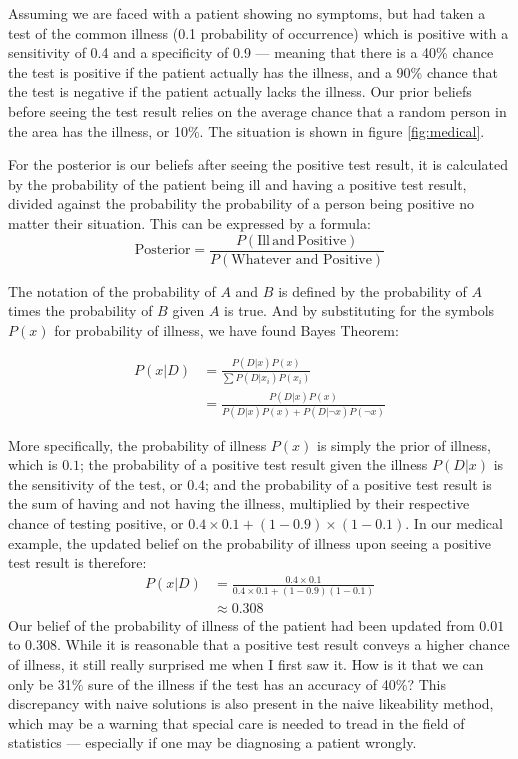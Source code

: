 \documentclass[a4paper,11pt]{article}
\begin{document}
Assuming we are faced with a patient showing no symptoms, but had taken a test of the common illness (0.1 probability of occurrence) which is positive with a sensitivity of 0.4 and a specificity of 0.9 --- meaning that there is a 40\% chance the test is positive if the patient actually has the illness, and a 90\% chance that the test is negative if the patient actually lacks the illness. Our prior beliefs before seeing the test result relies on the average chance that a random person in the area has the illness, or 10\%. The situation is shown in figure \ref{fig:medical}.

For the posterior is our beliefs after seeing the positive test result, it is calculated by the probability of the patient being ill and having a positive test result, divided against the probability the probability of a person being positive no matter their situation. This can be expressed by a formula:
\[
    \text{Posterior} = \frac{P(\text{Ill} \,\text{and}\, \text{Positive})}{P(\text{Whatever and Positive})}
\]

The notation of the probability of $A$ and $B$ is defined by the probability of $A$ times the probability of $B$ given $A$ is true. And by substituting for the symbols $P(x)$ for probability of illness, we have found Bayes Theorem:

\begin{align*}
    P(x|D) &= \frac{P(D|x) P(x)}{\sum P(D|x_i) P(x_i) }\\
     &= \frac{P(D|x)P(x)}{P(D|x)P(x) + P(D|\neg x)P(\neg x)}
\end{align*}

More specifically, the probability of illness $P(x)$ is simply the prior of illness, which is $0.1$; the probability of a positive test result given the illness $P(D|x)$ is the sensitivity of the test, or $0.4$; and the probability of a positive test result is the sum of having and not having the illness, multiplied by their respective chance of testing positive, or $0.4 \times 0.1 + (1- 0.9) \times (1-0.1)$. In our medical example, the updated belief on the probability of illness upon seeing a positive test result is therefore:
\begin{align*}
    P(x|D) &= \frac{0.4 \times 0.1}{0.4 \times 0.1 + (1-0.9) (1-0.1)}\\
    &\approx 0.308
\end{align*}
Our belief of the probability of illness of the patient had been updated from $0.01$ to $0.308$. While it is reasonable that a positive test result conveys a higher chance of illness, it still really surprised me when I first saw it. How is it that we can only be 31\% sure of the illness if the test has an accuracy of 40\%? This discrepancy with naive solutions is also present in the naive likeability method, which may be a warning that special care is needed to tread in the field of statistics --- especially if one may be diagnosing a patient wrongly.
\end{document}
